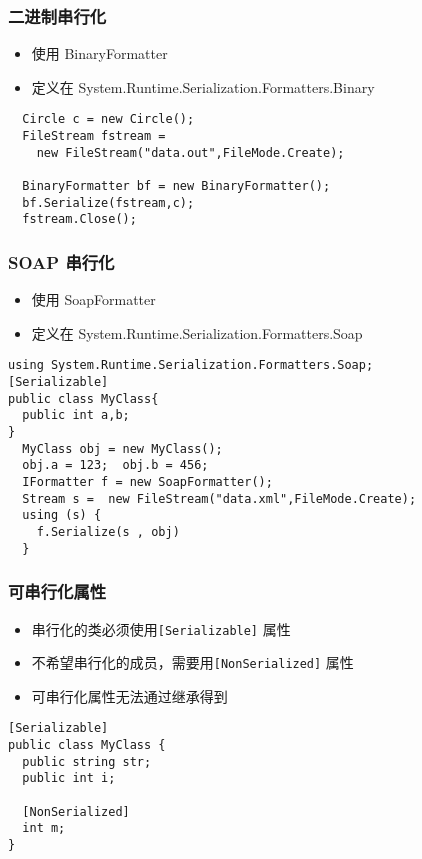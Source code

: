 \begin{frame}[fragile]
\frametitle{二进制串行化}
\begin{itemize}
\item 使用 BinaryFormatter 
\item 定义在 System.Runtime.Serialization.Formatters.Binary
\end{itemize}
\begin{lstlisting}
  Circle c = new Circle();
  FileStream fstream = 
    new FileStream("data.out",FileMode.Create);
 
  BinaryFormatter bf = new BinaryFormatter();
  bf.Serialize(fstream,c);
  fstream.Close();
\end{lstlisting}
\end{frame}

\begin{frame}[fragile]
\frametitle{SOAP 串行化}
\begin{itemize}
\item 使用 SoapFormatter
\item 定义在 System.Runtime.Serialization.Formatters.Soap
\end{itemize}
\begin{lstlisting}
using System.Runtime.Serialization.Formatters.Soap;
[Serializable]
public class MyClass{
  public int a,b;
}
  MyClass obj = new MyClass();
  obj.a = 123;  obj.b = 456;
  IFormatter f = new SoapFormatter();
  Stream s =  new FileStream("data.xml",FileMode.Create);
  using (s) {
    f.Serialize(s , obj)
  }
\end{lstlisting}
\end{frame}

\begin{frame}[fragile]
\frametitle{可串行化属性}
\begin{itemize}
\item 串行化的类必须使用\texttt{[Serializable]} 属性
\item 不希望串行化的成员，需要用\texttt{[NonSerialized]} 属性
\item 可串行化属性无法通过继承得到
\end{itemize}
\begin{lstlisting}
[Serializable]
public class MyClass {
  public string str;
  public int i;

  [NonSerialized]
  int m;
}
\end{lstlisting}
\end{frame}

